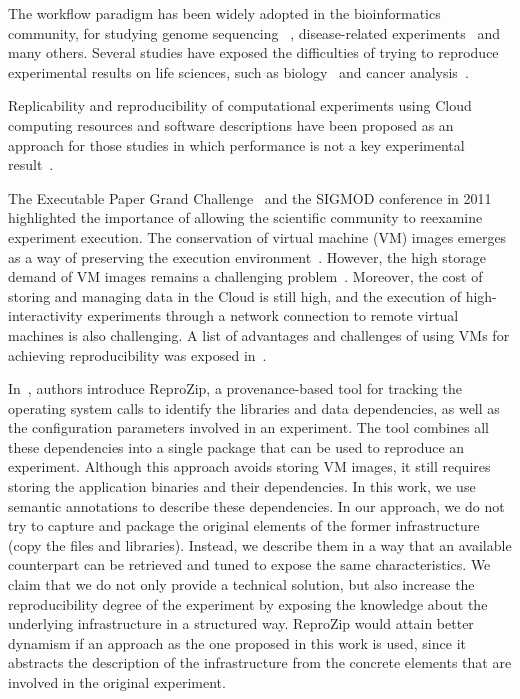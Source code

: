 The workflow paradigm has been widely adopted in the bioinformatics community, for studying genome sequencing ~\cite{blankenberg2010galaxy, giardine2005galaxy}, disease-related experiments~\cite{fisher2009systematic, gaizauskas2004} and many others. Several studies have exposed the difficulties of trying to reproduce experimental results on life sciences, such as biology~\cite{Ioannidis2009} and cancer analysis~\cite{ErringtonCancerRerpoducibility}.

Replicability and reproducibility of computational experiments using Cloud computing resources and software descriptions have been proposed as an approach for those studies in which performance is not a key experimental result~\cite{Crick14}.

The Executable Paper Grand Challenge~\cite{elsevierchallenge} and the SIGMOD conference in 2011~\cite{SIGMOD} highlighted the importance of allowing the scientific community to reexamine experiment execution. The conservation of virtual machine (VM) images emerges as a way of preserving the execution environment~\cite{Brammer,SHARE}. However, the high storage demand of VM images remains a challenging problem~\cite{Mao:2014:ROD:2600090.2512348,6552826}. Moreover, the cost of storing and managing data in the Cloud is still high, and the execution of high-interactivity experiments through a network connection to remote virtual machines is also challenging. A list of advantages and challenges of using VMs for achieving reproducibility was exposed in~\cite{Howe2012}.

In~\cite{reprozip}, authors introduce ReproZip, a provenance-based 
tool for tracking the operating system calls to identify the libraries and 
data dependencies, as well as the configuration parameters involved 
in an experiment. The tool combines all these dependencies into a 
single package that can be used to reproduce an experiment. 
Although this approach avoids storing VM images, it still requires 
storing the application binaries and their dependencies. In this work, we
use semantic annotations to describe these dependencies. In our 
approach, we do not try to capture and package the original elements of 
the former infrastructure (copy the files and libraries). Instead, we describe 
them in a way that an available counterpart can be retrieved and tuned to 
expose the same characteristics. We claim that we do not only provide a 
technical solution, but also increase the reproducibility degree of the 
experiment by exposing the knowledge about the underlying infrastructure 
in a structured way. ReproZip would attain better dynamism if an 
approach as the one proposed in this work is used, since it abstracts 
the description of the infrastructure from the concrete elements that 
are involved in the original experiment.

